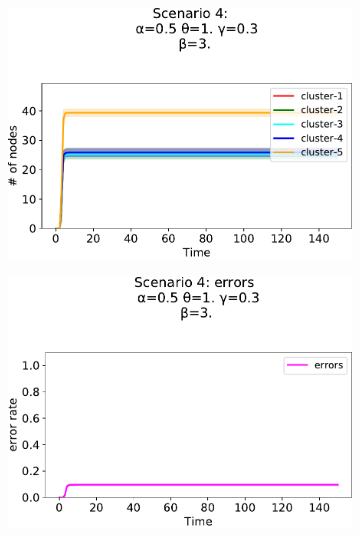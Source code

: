 \begin{figure}[!ht]
\begin{subfigure}[b]{0.32\textwidth}
    \includegraphics[width=\textwidth]{papers/swarm-intelligence2021/img/simulations/overlay-count_0_034567_α-0.5_θ-1._γ-0.3_β-3._ω-0._ζ-0..pdf}
  \end{subfigure}
  \hfill
  \begin{subfigure}[b]{0.32\textwidth}
    \centering
    \includegraphics[width=\textwidth]{papers/swarm-intelligence2021/img/simulations/overlay-errors_0_08_α-0.5_θ-1._γ-0.3_β-3._ω-0._ζ-0..pdf}
  \end{subfigure}
  \hfill
  \begin{subfigure}[b]{0.32\textwidth}
    \centering

\end{subfigure}
\end{figure}
